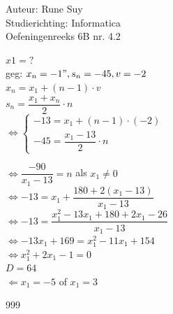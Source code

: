 \documentclass[a4paper]{article}
\begin{document}
  
\noindent \large Auteur: Rune Suy \\
\noindent \large Studierichting: Informatica\\
\noindent \large Oefeningenreeks 6B nr. 4.2\\

\medskip

\normalsize

$x1=?$\\

geg: $x_n = -1", s_n=-45, v=-2$\\

$x_n = x_1 + (n-1) \cdot v$\\

$s_n = \dfrac{x_1 + x_n}{2} \cdot n$\\

$\Leftrightarrow \left\{
\begin{array}{l}
    -13 = x_1 + (n-1)\cdot(-2)\\
    -45 = \dfrac{x_1 - 13}{2} \cdot n
\end{array}
\right.$

$\Leftrightarrow \dfrac{-90}{x_1 -13}=n$ als $x_1 \neq 0$\\

$\Leftrightarrow -13 = x_1 + \dfrac{180 + 2(x_1 - 13)}{x_1 - 13}$\\

$\Leftrightarrow -13 = \dfrac{x_1^2 - 13x_1 + 180 + 2x_1 - 26}{x_1 - 13}$\\

$\Leftrightarrow -13x_1 + 169 = x_1^2 - 11x_1 + 154$\\

$\Leftrightarrow x_1^2 + 2x_1 - 1 = 0$\\

$D=64$\\

$\Leftarrow x_1 = -5$ of $x_1 = 3$\\

\begin{thebibliography}{999}
\end{thebibliography}
\end{document}
